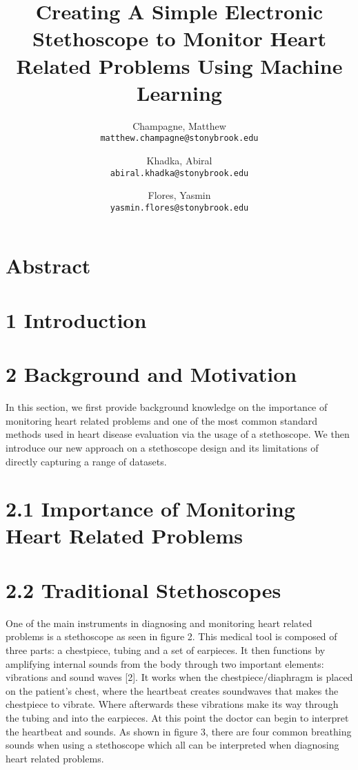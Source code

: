 \documentclass[twocolumn]{article}
\begin{document}
\title{Creating A Simple Electronic Stethoscope to Monitor Heart Related Problems Using Machine Learning}
\author{
  Champagne, Matthew \\
  \texttt{matthew.champagne@stonybrook.edu}
  \and
  Khadka, Abiral \\
  \texttt{abiral.khadka@stonybrook.edu}
  \and
  Flores, Yasmin \\
  \texttt{yasmin.flores@stonybrook.edu}
}

\maketitle
\section{Abstract} 

\section{1 Introduction}

\section{2 Background and Motivation} 
In this section, we first provide background knowledge on the importance of monitoring heart related problems and one of the most common standard methods used in heart disease evaluation via the usage of a stethoscope. We then introduce our new approach on a stethoscope design and its limitations of directly capturing a range of datasets.

\section{2.1 Importance of Monitoring Heart Related Problems} 

\section{2.2 Traditional Stethoscopes} 
One of the main instruments in diagnosing and monitoring heart related problems is a stethoscope as seen in figure 2. This medical tool is composed of three parts: a chestpiece, tubing and a set of earpieces. It then functions by amplifying internal sounds from the body through two important elements: vibrations and sound waves [2]. It works when the chestpiece/diaphragm is placed on the patient’s chest, where the heartbeat creates soundwaves that makes the chestpiece to vibrate. Where afterwards these vibrations make its way through the tubing and into the earpieces. At this point the doctor can begin to interpret the heartbeat and sounds. As shown in figure 3, there are four common breathing sounds when using a stethoscope which all can be interpreted when diagnosing heart related problems. 






\appendix
\end{document}
